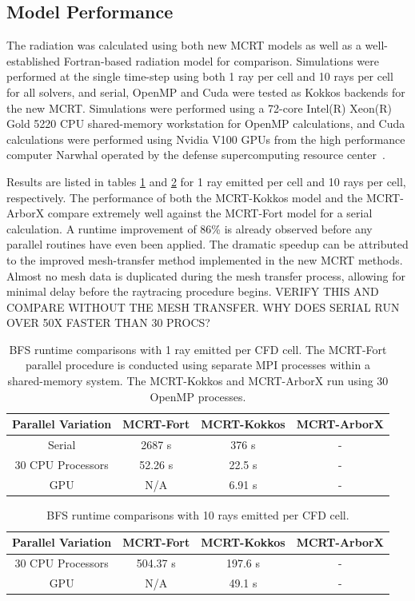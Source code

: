 \subsection{Model Performance}
The radiation was calculated using both new MCRT models as well as a well-established Fortran-based radiation model for comparison. Simulations were performed at the single time-step using both 1 ray per cell and 10 rays per cell for all solvers, and serial, OpenMP and Cuda were tested as Kokkos backends for the new MCRT. 
Simulations were performed using a 72-core Intel(R) Xeon(R) Gold 5220 CPU shared-memory workstation for OpenMP calculations, and Cuda calculations were performed using Nvidia V100 GPUs from the high performance computer Narwhal operated by the defense supercomputing resource center~\cite{something}.

Results are listed in tables \ref{table:BFS_runtime_table_1rpc} and \ref{table:BFS_runtime_table_10rpc} for 1 ray emitted per cell and 10 rays per cell, respectively. The performance of both the MCRT-Kokkos model and the MCRT-ArborX compare extremely well against the MCRT-Fort model for a serial calculation. A runtime improvement of 86\% is already observed before any parallel routines have even been applied.
The dramatic speedup can be attributed to the improved mesh-transfer method implemented in the new MCRT methods. 
Almost no mesh data is duplicated during the mesh transfer process, allowing for minimal delay before the raytracing procedure begins. VERIFY THIS AND COMPARE WITHOUT THE MESH TRANSFER. WHY DOES SERIAL RUN OVER 50X FASTER THAN 30 PROCS?

\begin{table}[h!]
\centering
\begin{tabular}{||c c c c||} 
 \hline
 Parallel Variation & MCRT-Fort & MCRT-Kokkos & MCRT-ArborX \\ [0.5ex] 
 \hline\hline
 Serial & 2687 s & 376 s & - \\ 
 30 CPU Processors & 52.26 s & 22.5 s & - \\
 GPU & N/A & 6.91 s & - \\
 \hline
\end{tabular}
\caption{BFS runtime comparisons with 1 ray emitted per CFD cell. The MCRT-Fort parallel procedure is conducted using separate MPI processes within a shared-memory system. The MCRT-Kokkos and MCRT-ArborX run using 30 OpenMP processes.}
\label{table:BFS_runtime_table_1rpc}
\end{table}

\begin{table}[h!]
\centering
\begin{tabular}{||c c c c||} 
 \hline
 Parallel Variation & MCRT-Fort & MCRT-Kokkos & MCRT-ArborX \\ [0.5ex] 
 \hline\hline
 30 CPU Processors & 504.37 s & 197.6 s & - \\
 GPU & N/A & 49.1 s & - \\
 \hline
\end{tabular}
\caption{BFS runtime comparisons with 10 rays emitted per CFD cell.}
\label{table:BFS_runtime_table_10rpc}
\end{table}


